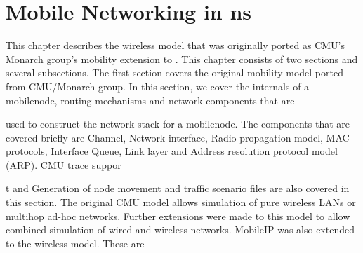 %
\chapter{Mobile Networking in ns}
\label{chap:mobility}

This chapter describes the wireless model that was originally ported as CMU's Monarch group's mobility extension to \ns. 
This chapter consists of two sections and several subsections. The first section covers the original mobility model ported from CMU/Monarch group. In this section, we cover the internals of a mobilenode, routing mechanisms and network components that are 





















used to construct the network stack for a mobilenode. The components that are covered briefly are Channel, Network-interface, Radio propagation model, MAC protocols, Interface Queue, Link layer and Address resolution protocol model (ARP). CMU trace suppor





















t and Generation of node movement and traffic scenario files are also covered in this section.
The original CMU model allows simulation of pure wireless LANs or multihop ad-hoc networks. Further extensions were made to this model to allow combined simulation of wired and wireless networks. MobileIP was also extended to the wireless model. These are





















